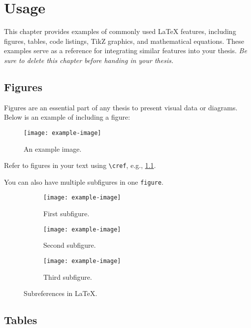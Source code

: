 \chapter{Usage}

This chapter provides examples of commonly used LaTeX features, including figures, tables, code listings, TikZ graphics, and mathematical equations.
These examples serve as a reference for integrating similar features into your thesis.
\textit{Be sure to delete this chapter before handing in your thesis.}

\section{Figures}

Figures are an essential part of any thesis to present visual data or diagrams. Below is an example of including a figure:

\begin{figure}[h!]
    \centering
    \texttt{[image: example-image]}
    \caption{An example image.}
    \label{fig:example}
\end{figure}

Refer to figures in your text using \texttt{\textbackslash cref}, e.g., \cref{fig:example}.

You can also have multiple subfigures in one \verb|figure|.

\begin{figure}[h!]
    \centering
    \begin{subfigure}{0.3\textwidth}
        \texttt{[image: example-image]}
        \caption{First subfigure.}
        \label{fig:first}
    \end{subfigure}
    \hfill
    \begin{subfigure}{0.3\textwidth}
        \texttt{[image: example-image]}
        \caption{Second subfigure.}
        \label{fig:second}
    \end{subfigure}
    \hfill
    \begin{subfigure}{0.3\textwidth}
        \texttt{[image: example-image]}
        \caption{Third subfigure.}
        \label{fig:third}
    \end{subfigure}
            
    \caption{Subreferences in \LaTeX.}
    \label{fig:figures}
\end{figure}

\section{Tables}

